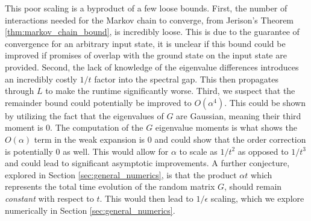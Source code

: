 \documentclass{article}
\newcommand{\norm}[1]{\left|\left| #1 \right|\right|}
\newcommand{\bigo}[1]{O\left(#1\right)}
\DeclareMathOperator{\sinc}{sinc}
\begin{document}

This poor scaling is a byproduct of a few loose bounds. First, the number of interactions needed for the Markov chain to converge, from Jerison's Theorem \ref{thm:markov_chain_bound}, is incredibly loose. This is due to the guarantee of convergence for an arbitrary input state, it is unclear if this bound could be improved if promises of overlap with the ground state on the input state are provided. Second, the lack of knowledge of the eigenvalue differences introduces an incredibly costly $1 / t$ factor into the spectral gap. This then propagates through $L$ to make the runtime significantly worse. Third, we suspect that the remainder bound could potentially be improved to $\bigo{\alpha^4}$. This could be shown by utilizing the fact that the eigenvalues of $G$ are Gaussian, meaning their third moment is 0. The computation of the $G$ eigenvalue moments is what shows the $\bigo{\alpha}$ term in the weak expansion is 0 and could show that the order correction is potentially 0 as well. This would allow for $\alpha$ to scale as $1 / t^2$ as opposed to $1 / t^3$ and could lead to significant asymptotic improvements. A further conjecture, explored in Section \ref{sec:general_numerics}, is that the product $\alpha t$ which represents the total time evolution of the random matrix $G$, should remain \emph{constant} with respect to $t$. This would then lead to $1/\epsilon$ scaling, which we explore numerically in Section \ref{sec:general_numerics}.
\end{document}
